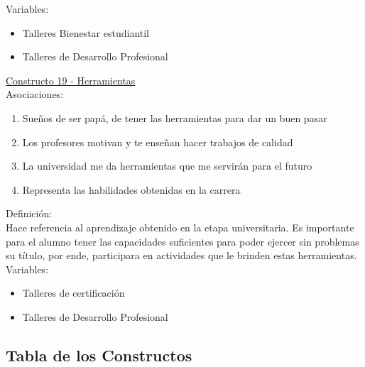 Variables:
\begin{itemize}
	\item Talleres Bienestar estudiantil
	\item Talleres de Desarrollo Profesional	
\end{itemize}


\underline {Constructo 19 - Herramientas} \\
Asociaciones:
\begin{enumerate}
	\item Sueños de ser papá, de tener las herramientas para dar un buen pasar
	\item Los profesores motivan y te enseñan hacer trabajos de calidad	
	\item La universidad me da herramientas que me servirán para el futuro
	\item Representa las habilidades obtenidas en la carrera
\end{enumerate}

Definición:\\
Hace referencia al aprendizaje obtenido en la etapa universitaria. Es importante para el alumno tener las capacidades suficientes para poder ejercer sin problemas su título, por ende, participara en actividades que le brinden estas herramientas.\\

Variables:
\begin{itemize}
	\item Talleres de certificación
	\item Talleres de Desarrollo Profesional	
\end{itemize}


\subsection{Tabla de los Constructos}

